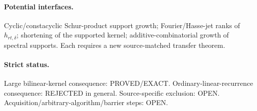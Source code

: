 \documentclass[11pt]{article}\usepackage[margin=.88in]{geometry}\usepackage{amsmath,amssymb}
\begin{document}
\paragraph{Potential interfaces.} Cyclic/constacyclic Schur-product support growth; Fourier/Hasse-jet ranks of \(h_{rt,\delta}\); shortening of the supported kernel; additive-combinatorial growth of spectral supports. Each requires a new source-matched transfer theorem.
\paragraph{Strict status.} Large bilinear-kernel consequence: PROVED/EXACT. Ordinary-linear-recurrence consequence: REJECTED in general. Source-specific exclusion: OPEN. Acquisition/arbitrary-algorithm/barrier steps: OPEN.
\end{document}
